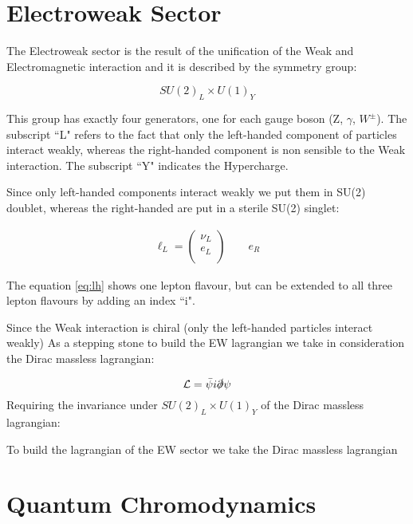 \section{Electroweak Sector}

The Electroweak sector is the result of the unification of the Weak and Electromagnetic interaction and it 
is described by the symmetry group:

\begin{equation}
    SU(2)_L \times U(1)_Y
\end{equation}

This group has exactly four generators, one for each gauge boson (Z, $\gamma$, $W^{\pm}$).
The subscript “L" refers to the fact that only the left-handed component of particles interact weakly, 
whereas the right-handed component is non sensible to the Weak interaction.
The subscript “Y" indicates the Hypercharge.

Since only left-handed components interact weakly we put them in SU(2) doublet, whereas the right-handed
are put in a sterile SU(2) singlet:

\begin{align}
    \ell_L = 
    \begin{pmatrix}
    \nu_L\\
    e_L \\
    \end{pmatrix}
    \qquad
    e_R
\label{eq:lh}
\end{align}

The equation \ref{eq:lh} shows one lepton flavour, but can be extended to all three lepton flavours by 
adding an index “i".

Since the Weak interaction is chiral (only the left-handed particles interact weakly)
As a stepping stone to build the EW lagrangian we take in consideration the Dirac massless lagrangian:

\begin{equation}
    \mathcal{L} = \bar{\psi} i \slashed{\partial} \psi
\end{equation}
Requiring the invariance under $SU(2)_L \times U(1)_Y$ of the Dirac massless lagrangian:

To build the lagrangian of the EW sector we take the Dirac massless lagrangian 



\section{Quantum Chromodynamics}

